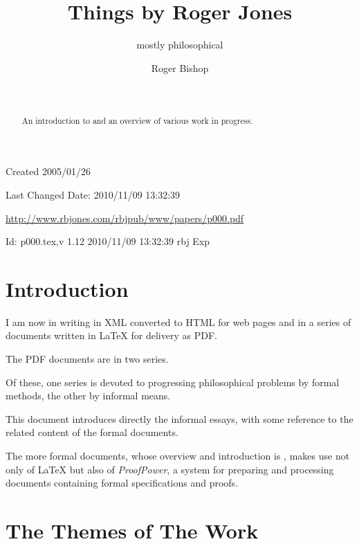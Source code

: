 \documentclass[numreferences]{rbjk}
\begin{document}
                                                                                   
\begin{article}
\begin{opening}  
\title{Things by Roger Jones}
\subtitle{mostly philosophical}
\author{Roger Bishop }
\date{\ }

\begin{abstract}
An introduction to and an overview of various work in progress.
\end{abstract}
\end{opening}

\vfill

\begin{centering}
{\footnotesize
Created 2005/01/26

Last Changed $ $Date: 2010/11/09 13:32:39 $ $

\href{http://www.rbjones.com/rbjpub/www/papers/p000.pdf}
{http://www.rbjones.com/rbjpub/www/papers/p000.pdf}

$ $Id: p000.tex,v 1.12 2010/11/09 13:32:39 rbj Exp $ $

}%
\end{centering}

\newpage

\setcounter{tocdepth}{4}
{\parskip=0pt\tableofcontents}

\section{Introduction}

I am now in writing in XML converted to HTML for web pages and in a
series of documents written in LaTeX for delivery as PDF.

The PDF documents are in two series.

Of these, one series is devoted to progressing philosophical problems
by formal methods, the other by informal means.

This document introduces directly the informal essays, with some
reference to the related content of the formal documents.

The more formal documents, whose overview and introduction is \cite{rbjt000}, makes use not only of {\LaTeX} but also of {\it ProofPower}, a system for preparing and processing documents containing formal specifications and proofs.

\section{The Themes of The Work}


\end{article}
\end{document}

